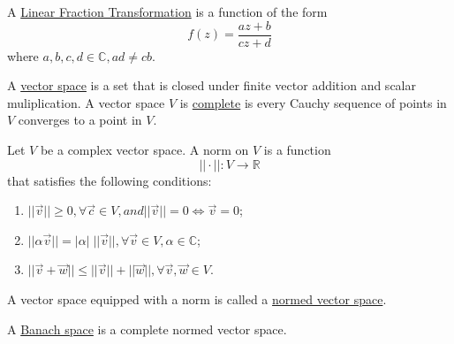 \begin{defn}
A \underline{Linear Fraction Transformation} is a function of the form
\[f(z) = \frac{az + b}{cz + d}\]
where $a,b,c,d \in \mathbb{C}, ad \neq cb$.
\end{defn}

\begin{defn}
A \underline{vector space} is a set that is closed under finite vector addition and scalar muliplication.  A vector space $V$ is \underline{complete} is every Cauchy sequence of points in $V$ converges to a point in $V$.
\end{defn}

\begin{defn}
Let $V$ be a complex vector space.  A norm on $V$ is a function
\[||\cdot||: V \rightarrow \mathbb{R}\]
that satisfies the following conditions:
\begin{enumerate}
\item $||\vec{v}|| \geq 0, \forall \vec{c} \in V, and ||\vec{v}|| = 0 \Leftrightarrow \vec{v} = 0$;
\item $||\alpha\vec{v}|| = |\alpha|\;||\vec{v}||, \forall\vec{v} \in V, \alpha \in \mathbb{C}$;
\item $||\vec{v} + \vec{w}|| \leq ||\vec{v}|| + ||\vec{w}||, \forall \vec{v}, \vec{w} \in V$.
\end{enumerate}
A vector space equipped with a norm is called a \underline{normed vector space}.
\end{defn}

\begin{defn}
A \underline{Banach space} is a complete normed vector space.
\end{defn}